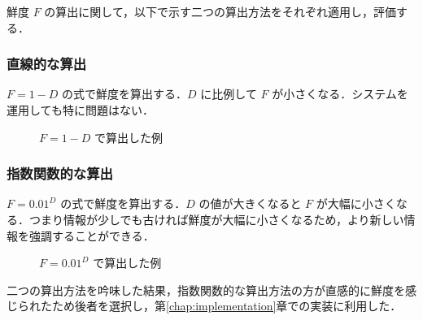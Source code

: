 鮮度 $F$ の算出に関して，以下で示す二つの算出方法をそれぞれ適用し，評価する．

\subsubsection{直線的な算出}

$ F = 1 - D $ の式で鮮度を算出する．$D$ に比例して $F$ が小さくなる．システムを運用しても特に問題はない．

\begin{figure}[htbp]
  \begin{center}
  \end{center}
  \caption{$ F = 1 - D $ で算出した例}
\end{figure}

\subsubsection{指数関数的な算出}

$ F =  0.01 ^ D $ の式で鮮度を算出する．$D$ の値が大きくなると $F$ が大幅に小さくなる．つまり情報が少しでも古ければ鮮度が大幅に小さくなるため，より新しい情報を強調することができる．

\begin{figure}[htbp]
  \begin{center}
  \end{center}
  \caption{$ F =  0.01 ^ D $ で算出した例}
\end{figure}

二つの算出方法を吟味した結果，指数関数的な算出方法の方が直感的に鮮度を感じられたため後者を選択し，第\ref{chap:implementation}章での実装に利用した．
